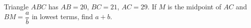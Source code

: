 Triangle $ABC$ has $AB=20$, $BC=21$, $AC=29$. If $M$ is the midpoint of $AC$ and $BM=\dfrac{a}{b}$ in lowest terms, find $a+b$.
